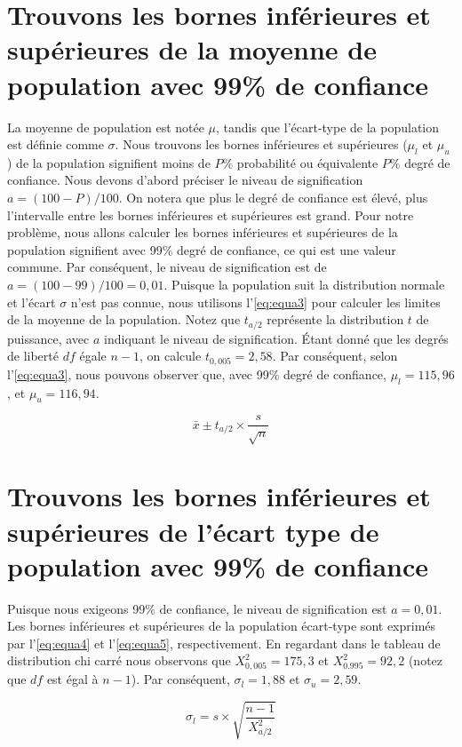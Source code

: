 \section{Trouvons les bornes inférieures et supérieures de la moyenne de population avec 99\% de confiance}
La moyenne de population est notée $\mu$, tandis que l'écart-type de la population est définie comme $\sigma$. Nous trouvons les bornes inférieures et supérieures ($\mu_l$ et $\mu_u$) de la population signifient moins de $P\%$ probabilité ou équivalente $P\%$ degré de confiance. Nous devons d'abord préciser le niveau de signification $a = (100-P) / 100$. On notera que plus le degré de confiance est élevé, plus l'intervalle entre les bornes inférieures et supérieures est grand. Pour notre problème, nous allons calculer les bornes inférieures et supérieures de la population signifient avec 99\% degré de confiance, ce qui est une valeur commune. Par conséquent, le niveau de signification est de $a = (100-99) /100=0,01$. Puisque la population suit la distribution normale et l'écart $\sigma$ n'est pas connue, nous utilisons l'\ref{eq:equa3} pour calculer les limites de la moyenne de la population. Notez que $t_ {a / 2}$ représente la distribution $t$ de puissance, avec $a$ indiquant le niveau de signification. Étant donné que les degrés de liberté $df$ égale $n-1$, on calcule $t_{0,005} = 2,58$. Par conséquent, selon l'\ref{eq:equa3}, nous pouvons observer que, avec 99\% degré de confiance, $\mu_l = 115,96$, et $\mu_u = 116,94$.

\begin{equation}\label{eq:equa3}
 \bar{x} \pm t_{a/2} \times \frac{s}{\sqrt{n}}
\end{equation}

\section{Trouvons les bornes inférieures et supérieures de l'écart type de population avec 99\% de confiance}
Puisque nous exigeons 99\% de confiance, le niveau de signification est $a = 0,01$. Les bornes inférieures et supérieures de la population écart-type sont exprimés par l'\ref{eq:equa4} et l'\ref{eq:equa5}, respectivement. En regardant dans le tableau de distribution chi carré nous observons que $X_ {0,005}^2 = 175,3$ et $X_{0.995}^2 = 92,2 $ (notez que $df$ est égal à $n-1$). Par conséquent, $\sigma_l = 1,88$ et $\sigma_u = 2,59$.

\begin{equation}\label{eq:equa4}
 \sigma_l = s \times \sqrt{\frac{n-1}{X_{a/2}^2}}
\end{equation}

